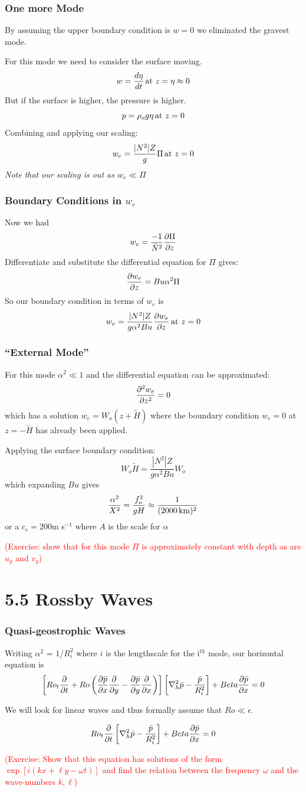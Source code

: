 \documentclass[xcolor=dvipsnames]{beamer}
\begin{document}
\begin{frame}
\frametitle{One more Mode}

By assuming the upper boundary condition is $w=0$ we eliminated the gravest mode.  

For this mode we need to consider the surface moving.
\[ w = \frac{d\eta}{dt} \, {\rm at}\ z=\eta \approx 0\]
But if the surface is higher, the pressure is higher.
\[ p = \rho_o g \eta \, {\rm at}\ z=0\]
Combining and applying our scaling:
\[ w_e = \frac {|N^2|Z}{g}\Pi\, {\rm at}\ z=0\]
{\it Note that our scaling is out as $w_e \ll \Pi$}
\end{frame}

\begin{frame}
\frametitle{Boundary Conditions in $w_e$}

Now we had
\[ w_e = \frac{-1}{\tilde N^2} \frac{\partial \Pi}{\partial z}\]
Differentiate and substitute the differential equation for $\Pi$ gives:
\[ \frac{\partial w_e}{\partial z} = Bu \alpha^2 \Pi\]
So our boundary condition in terms of $w_e$ is
\[ w_e = \frac{|N^2|Z}{g \alpha^2 Bu}  \frac{\partial w_e}{\partial z} \, {\rm at}\ z=0  \]
\end{frame}

\begin{frame}
\frametitle{``External Mode''}
For this mode $\alpha^2 \ll 1$ and the differential equation can be approximated:
\[\frac{\partial^2 w_e}{\partial z^2} = 0\]
which has a solution $w_e = W_o (z+\tilde H)$ where the boundary condition $w_e = 0$ at $z=-\tilde H$ has already been applied.

Applying the surface boundary condition:
\[W_o \tilde H = \frac{|N^2|Z}{g \alpha^2 Bu} W_o\]
which expanding $Bu$ gives
\[ \frac{\alpha^2} {X^2}  = \frac{f_o^2}{g H} \approx \frac{1}{(2000\,{\rm km})^2} \]
or a $c_e = 200$m s$^{-1}$ where $A$ is the scale for $\alpha$

\textcolor{red}{(Exercise: show that for this mode $\Pi$ is approximately constant with depth as are $u_g$ and $v_g$)}
\end{frame}

\section{5.5 Rossby Waves}

\begin{frame}
\frametitle{Quasi-geostrophic Waves}

Writing $\alpha^2$ = $1/R_i^2$ where $i$ is the lengthscale for the i$^{th}$ mode, our horizontal equation is
\[
\left[ Ro_t \frac {\partial}{\partial t} + Ro \left(\frac{\partial \bar p}{\partial x} \frac {\partial}{\partial y} - \frac{\partial \bar p}{\partial y} \frac {\partial}{\partial x}\right)\right] \left[ \nabla_h^2 \bar p - \frac{\bar p}{R_i^2}\right] + Beta \frac{\partial \bar p}{\partial x} =0\]

We will look for linear waves and thus formally assume that $Ro \ll \epsilon$.  

\[
Ro_t \frac {\partial}{\partial t} \left[ \nabla_h^2 \bar p - \frac{\bar p}{R_i^2}\right] + Beta \frac{\partial \bar p}{\partial x} =0\]

\textcolor{red}{(Exercise: Show that this equation has solutions of the form $\exp[i(kx+\ell y-\omega t)]$ and find the relation between the frequency $\omega$ and the wave-numbers $k, \ell$)}
\end{frame}
\end{document}
